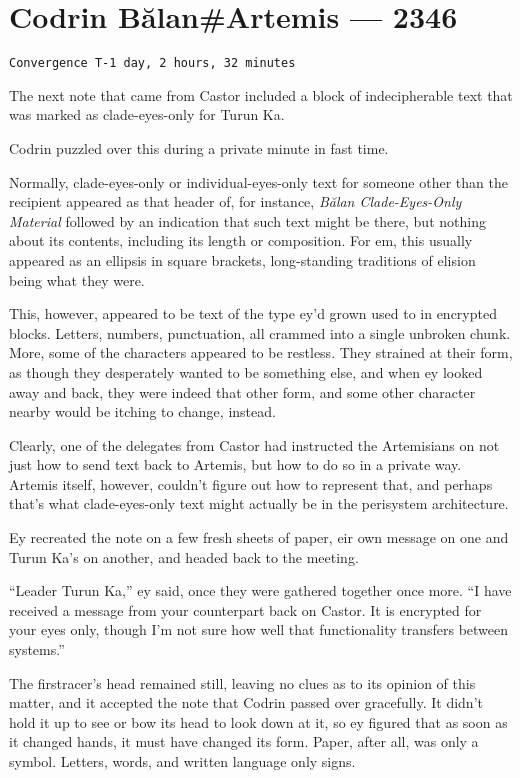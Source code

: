 \hypertarget{codrin-bux103lanartemis-2346}{%
\chapter{Codrin Bălan\#Artemis — 2346}\label{codrin-bux103lanartemis-2346}}

\begin{verbatim}
Convergence T-1 day, 2 hours, 32 minutes
\end{verbatim}

The next note that came from Castor included a block of indecipherable text that was marked as clade-eyes-only for Turun Ka.

Codrin puzzled over this during a private minute in fast time.

Normally, clade-eyes-only or individual-eyes-only text for someone other than the recipient appeared as that header of, for instance, \emph{Bălan Clade-Eyes-Only Material} followed by an indication that such text might be there, but nothing about its contents, including its length or composition. For em, this usually appeared as an ellipsis in square brackets, long-standing traditions of elision being what they were.

This, however, appeared to be text of the type ey'd grown used to in encrypted blocks. Letters, numbers, punctuation, all crammed into a single unbroken chunk. More, some of the characters appeared to be restless. They strained at their form, as though they desperately wanted to be something else, and when ey looked away and back, they were indeed that other form, and some other character nearby would be itching to change, instead.

Clearly, one of the delegates from Castor had instructed the Artemisians on not just how to send text back to Artemis, but how to do so in a private way. Artemis itself, however, couldn't figure out how to represent that, and perhaps that's what clade-eyes-only text might actually be in the perisystem architecture.

Ey recreated the note on a few fresh sheets of paper, eir own message on one and Turun Ka's on another, and headed back to the meeting.

``Leader Turun Ka,'' ey said, once they were gathered together once more. ``I have received a message from your counterpart back on Castor. It is encrypted for your eyes only, though I'm not sure how well that functionality transfers between systems.''

The firstracer's head remained still, leaving no clues as to its opinion of this matter, and it accepted the note that Codrin passed over gracefully. It didn't hold it up to see or bow its head to look down at it, so ey figured that as soon as it changed hands, it must have changed its form. Paper, after all, was only a symbol. Letters, words, and written language only signs.

